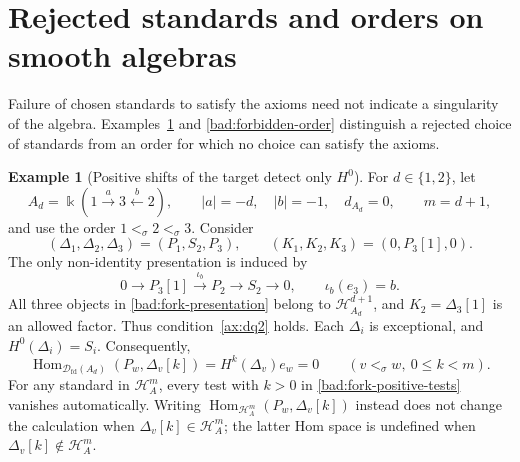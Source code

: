 \documentclass[11pt,a4paper]{article}
\newcommand{\D}{\mathcal D}
\renewcommand{\H}{\mathcal H}
\newcommand{\std}{\Delta}
\DeclareMathOperator{\fd}{fd}
\DeclareMathOperator{\Hom}{Hom}
\theoremstyle{plain}
\theoremstyle{definition}
\newtheorem{example}[theorem]{Example}
\numberwithin{equation}{section}
\begin{document}
\section{Rejected standards and orders on smooth algebras}
\label{bad:smooth}

Failure of chosen standards to satisfy the axioms need not indicate
a singularity of the algebra. Examples~\ref{bad:fork} and
\ref{bad:forbidden-order} distinguish a rejected choice of standards
from an order for which no choice can satisfy the axioms.

\begin{example}[Positive shifts of the target detect only $H^0$]
\label{bad:fork}
For $d\in\{1,2\}$, let
\begin{equation}\label{bad:fork-algebra}
 A_d=\Bbbk(1\xrightarrow{a}3\xleftarrow{b}2),\qquad
 |a|=-d,\quad |b|=-1,\quad d_{A_d}=0,
 \qquad m=d+1,
\end{equation}
and use the order $1<_\sigma2<_\sigma3$. Consider
\begin{equation}\label{bad:fork-standards}
 (\std_1,\std_2,\std_3)=(P_1,S_2,P_3),
 \qquad (K_1,K_2,K_3)=(0,P_3[1],0).
\end{equation}
The only non-identity presentation is induced by
\begin{equation}\label{bad:fork-presentation}
 0\longrightarrow P_3[1]\xrightarrow{\iota_b}P_2
 \longrightarrow S_2\longrightarrow0,
 \qquad\iota_b(e_3)=b.
\end{equation}
All three objects in \eqref{bad:fork-presentation} belong to
$\H_{A_d}^{d+1}$, and $K_2=\std_3[1]$ is an allowed factor.
Thus condition~\ref{ax:dq2} holds. Each $\std_i$ is exceptional,
and $H^0(\std_i)=S_i$. Consequently,
\begin{equation}\label{bad:fork-positive-tests}
 \Hom_{\D_{\fd}(A_d)}(P_w,\std_v[k])
 =H^k(\std_v)e_w=0
 \qquad(v<_\sigma w,\ 0\leq k<m).
\end{equation}
For any standard in $\H_A^m$, every test with $k>0$ in
\eqref{bad:fork-positive-tests} vanishes automatically.
Writing $\Hom_{\H_A^m}(P_w,\std_v[k])$ instead does not change the
calculation when $\std_v[k]\in\H_A^m$; the latter Hom space is
undefined when $\std_v[k]\notin\H_A^m$.


\end{example}
\end{document}
